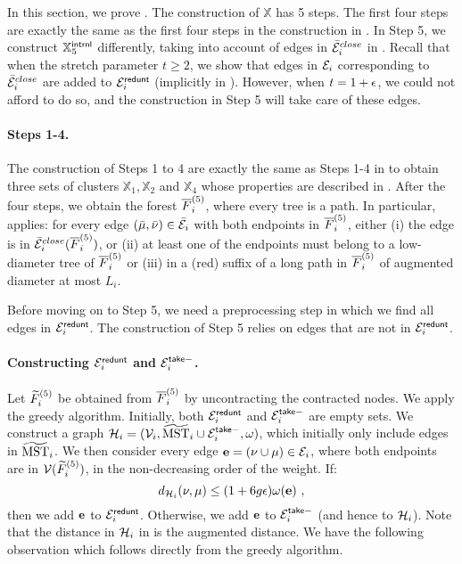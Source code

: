 In this section, we prove . The construction of $\mathbb{X}$ has 5 steps. The first four steps are exactly the same as the first four steps in the construction in . In Step 5, we construct $\mathbb{X}^{\mathsf{intrnl}}_5$ differently, taking into account of edges in $\bar{\mathcal{E}}_i^{close}$ in . Recall that when the stretch parameter $t\geq 2$, we show that edges in $\mathcal{E}_i$ corresponding to $\bar{\mathcal{E}}_i^{close}$ are added to $\mathcal{E}_i^{\mathsf{redunt}}$ (implicitly in ). However, when $t = 1+\epsilon$, we could not afford to do so, and the construction in Step 5 will take care of these edges.

\paragraph{Steps 1-4.~} The construction of Steps 1 to 4 are exactly the same as Steps 1-4 in  to obtain three sets of clusters $\mathbb{X}_1,\mathbb{X}_2$ and $\mathbb{X}_4$ whose properties are described in . After the four steps, we obtain the forest $\overline{F}^{(5)}_i$, where every tree is a path. In particular,  applies: for every edge $(\bar\mu,\bar\nu)\in \bar{\mathcal{E}}_i$ with both endpoints in $\overline{F}^{(5)}_i$, either (i) the edge is in $ \bar{\mathcal{E}}^{close}_i(\overline{F}^{(5)}_i)$, or (ii) at least one of the endpoints must belong to a low-diameter tree of $\overline{F}^{(5)}_i$ or (iii) in a (red) suffix of a long path in $\overline{F}^{(5)}_i$  of augmented diameter at most $L_i$.

Before moving on to Step 5, we need a preprocessing step in which we find all edges in $\mathcal{E}^{\mathsf{redunt}}_i$. The construction of Step 5 relies on edges that are not in  $\mathcal{E}^{\mathsf{redunt}}_i$. 

\paragraph{Constructing $\mathcal{E}_i^{\mathsf{redunt}}$ and $\mathcal{E}_i^{\mathsf{take}-}$.~} Let $\widetilde{F}^{(5)}_i$ be obtained from $\overline{F}^{(5)}_i$ by uncontracting the contracted nodes.  We apply the greedy algorithm. Initially, both $\mathcal{E}_i^{\mathsf{redunt}}$ and $\mathcal{E}_i^{\mathsf{take}-}$ are empty sets.  We construct a graph $\mathcal{H}_i = (\mathcal{V}_i, \widetilde{\mathrm{MST}}_{i}\cup \mathcal{E}_i^{\mathsf{take}-}, \omega)$, which initially only include edges in $\widetilde{\mathrm{MST}}_{i}$. We then consider every edge $\mathbf{e} = (\nu\cup \mu) \in \mathcal{E}_i$, where both endpoints are in $\mathcal{V}(\widetilde{F}^{(5)}_i)$, in the non-decreasing order of the weight. If:
\begin{equation}\label{eq:greedy-HiE}
	d_{\mathcal{H}_i }(\nu,\mu) \leq (1+6g\epsilon) \omega(\mathbf{e})~,
\end{equation}
then we add $\mathbf{e}$ to $\mathcal{E}_i^{\mathsf{redunt}}$. Otherwise, we add $\mathbf{e}$ to $\mathcal{E}_i^{\mathsf{take}-}$ (and hence to $\mathcal{H}_i$).  Note that the distance in $\mathcal{H}_i$ in  is the augmented distance.  We have the following observation which follows directly from the greedy algorithm.


